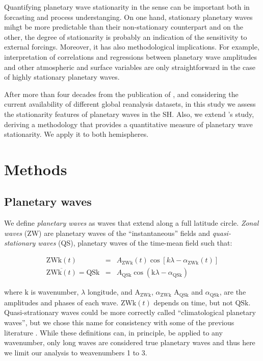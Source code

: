 \documentclass[draft,linenumbers]{agujournal2018}
\begin{document}
Quantifying planetary wave stationarity in the \citet{vanloon1972} sense
can be important both in forcasting and process understanging. On one
hand, stationary planetary waves mihgt be more predictable than their
non-stationary counterpart and on the other, the degree of stationarity
is probably an indication of the sensitivity to external forcings.
Moreover, it has also methodological implications. For example,
interpretation of correlations and regressions between planetary wave
amplitudes and other atmospheric and surface variables
\citep[e.g.~][]{turner2017} are only straightforward in the case of
highly stationary planetary waves.

After more than four decades from the publication of
\citet{vanloon1972}, and considering the current availability of
different global reanalysis datasets, in this study we assess the
stationarity features of planetary waves in the SH. Also, we extend
\citet{vanloon1972}'s study, deriving a methodology that provides a
quantitative measure of planetary wave stationarity. We apply it to both
hemispheres.

\section{Methods}

\subsection{Planetary waves}

We define \emph{planetary waves} as waves that extend along a full
latitude circle. \emph{Zonal waves} (ZW) are planetary waves of the
``instantaneous'' fields and \emph{quasi-stationary waves} (QS),
planetary waves of the time-mean field such that:

\begin{linenomath*}
\begin{eqnarray}\label{eq:ZW}
\mathrm{ZWk}(t) & = & A_\mathrm{ZWk}(t)\cos \left [ k\lambda - \alpha_\mathrm{ZWk}(t) \right ] \\ 
\overline{\mathrm{ZWk}(t)} = \mathrm{QSk} & = & A_\mathrm{QSk}\cos \left (  \mathrm{k}\lambda - \alpha_\mathrm{QSk} \right ) \label{eq:QS}
\end{eqnarray}
\end{linenomath*}

where \(\mathrm{k}\) is wavenumber, \(\lambda\) longitude, and
\(\mathrm{A_{ZWk}}\), \(\alpha_\mathrm{ZWk}\) \(\mathrm{A_{QSk}}\) and
\(\alpha_\mathrm{QSk}\), are the amplitudes and phases of each wave.
\(\mathrm{ZWk}(t)\) depends on time, but not \(\mathrm{QSk}\).
Quasi-strationary waves could be more correctly called ``climatological
planetary waves'', but we chose this name for consistency with some of
the previous literature \citep[e.g.~][]{quintanar1995, turner2017}.
While these definitions can, in principle, be applied to any wavenumber,
only long waves are considered true planetary waves and thus here we
limit our analysis to weavenumbers 1 to 3.
\end{document}

